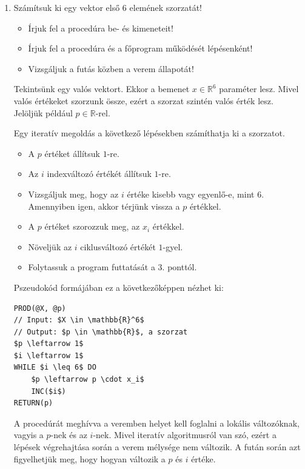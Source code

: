 \documentclass[a4paper]{article}
\newenvironment{solution}
{\color{RoyalBlue}}{\bigskip}
\begin{document}
\begin{enumerate}
$$
g(n) =
\begin{cases}
g(n - 1) + 4 \cdot g(n - 2), & n > 0, \\
8, & \text{egyébként. }
\end{cases}
$$

Számítsuk ki az $f(30)$ és $g(5)$ értékeket!

\item

Számítsuk ki egy vektor első 6 elemének szorzatát!
\begin{itemize}
	\item Írjuk fel a procedúra be- és kimeneteit!
	\item Írjuk fel a procedúra és a főprogram működését lépésenként!
	\item Vizsgáljuk a futás közben a verem állapotát!
\end{itemize}

\begin{solution}
Tekintsünk egy valós vektort. Ekkor a bemenet $x \in \mathbb{R}^6$ paraméter lesz. Mivel valós értékeket szorzunk össze, ezért a szorzat szintén valós érték lesz. Jelöljük például $p \in \mathbb{R}$-rel.

Egy iteratív megoldás a következő lépésekben számíthatja ki a szorzatot.
\begin{itemize}
	\item[1] A $p$ értéket állítsuk $1$-re.
	\item[2] Az $i$ indexváltozó értékét állítsuk $1$-re.
	\item[3] Vizsgáljuk meg, hogy az $i$ értéke kisebb vagy egyenlő-e, mint $6$. Amennyiben igen, akkor térjünk vissza a $p$ értékkel.
	\item[4] A $p$ értéket szorozzuk meg, az $x_i$ értékkel.
	\item[5] Növeljük az $i$ ciklusváltozó értékét $1$-gyel.
	\item[6] Folytassuk a program futtatását a 3. ponttól.
\end{itemize}

Pszeudokód formájában ez a következőképpen nézhet ki:
\begin{lstlisting}[mathescape]
PROD(@X, @p)
// Input: $X \in \mathbb{R}^6$
// Output: $p \in \mathbb{R}$, a szorzat
$p \leftarrow 1$
$i \leftarrow 1$
WHILE $i \leq 6$ DO
    $p \leftarrow p \cdot x_i$
    INC($i$)
RETURN(p)
\end{lstlisting}

A procedúrát meghívva a veremben helyet kell foglalni a lokális változóknak, vagyis a $p$-nek és az $i$-nek. Mivel iteratív algoritmusról van szó, ezért a lépések végrehajtása során a verem mélysége nem változik. A fután során azt figyelhetjük meg, hogy hogyan változik a $p$ és $i$ értéke.


\end{solution}
\end{enumerate}
\end{document}
